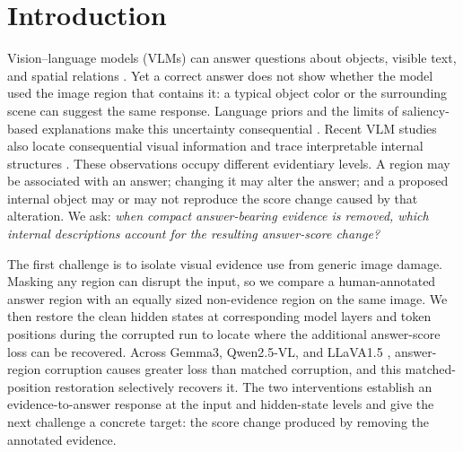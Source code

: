 \section{Introduction}

Vision--language models (VLMs) can answer questions about objects, visible text, and spatial relations \citep{antol2015vqa,okvqa,schwenk2022aokvqa}. Yet a correct answer does not show whether the model used the image region that contains it: a typical object color or the surrounding scene can suggest the same response. Language priors and the limits of saliency-based explanations make this uncertainty consequential \citep{goyal2017vqav2,agrawal2018vqacp,adebayo2018sanity,jain2019attention}. Recent VLM studies also locate consequential visual information and trace interpretable internal structures \citep{golovanevsky2025notice,li2026causalTracing,yang2026vlmcircuittracing}. These observations occupy different evidentiary levels. A region may be associated with an answer; changing it may alter the answer; and a proposed internal object may or may not reproduce the score change caused by that alteration. We ask: \emph{when compact answer-bearing evidence is removed, which internal descriptions account for the resulting answer-score change?}

The first challenge is to isolate visual evidence use from generic image damage. Masking any region can disrupt the input, so we compare a human-annotated answer region with an equally sized non-evidence region on the same image. We then restore the clean hidden states at corresponding model layers and token positions during the corrupted run to locate where the additional answer-score loss can be recovered. Across Gemma3, Qwen2.5-VL, and LLaVA1.5 \citep{gemma3,qwen25vl,llava}, answer-region corruption causes greater loss than matched corruption, and this matched-position restoration selectively recovers it. The two interventions establish an evidence-to-answer response at the input and hidden-state levels and give the next challenge a concrete target: the score change produced by removing the annotated evidence.

